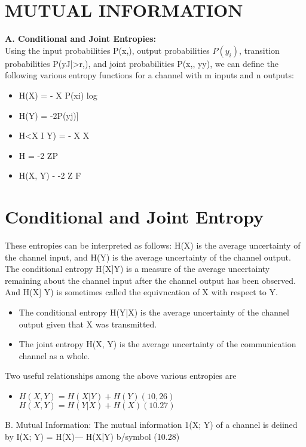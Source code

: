 


\section{ MUTUAL INFORMATION}
\textbf{A. Conditional and Joint Entropies:}\\
Using the input probabilities P(x,), output probabilities $P(y_i)$, transition probabilities P(yJ|>r,),
and joint probabilities P(x,, yy), we can define the following various entropy functions for a channel
with m inputs and n outputs:
 
\begin{itemize}
\item H(X) = - X P(xi) log %
\item H(Y) = -2P(yj)]%
\item H<X I Y) = - X X %
\item H = -2 ZP%
\item H(X, Y) - -2 Z F%
\end{itemize}



\section{Conditional and Joint Entropy}
These entropies can be interpreted as follows: H(X) is the average uncertainty of the channel input,
and H(Y) is the average uncertainty of the channel output. The conditional entropy H(X]Y) is a
measure of the average uncertainty remaining about the channel input after the channel output has
been observed. And H(X] Y) is sometimes called the equivncation of X with respect to Y. \begin{itemize} \item The
conditional entropy H(Y|X) is the average uncertainty of the channel output given that X was
transmitted.\item  The joint entropy H(X, Y) is the average uncertainty of the communication channel as a
whole.\end{itemize}


Two useful relationships among the above various entropies are
\begin{itemize} \item
$H(X, Y)=H(X|Y)+H(Y) (10,26)$
$H(X,Y)=H(Y|X)+H(X) (10.27)$
\end{itemize}
B. Mutual Information:
The mutual information 1(X; Y) of a channel is deiined by
I(X; Y) = H(X)— H(X|Y) b/symbol (10.28)
